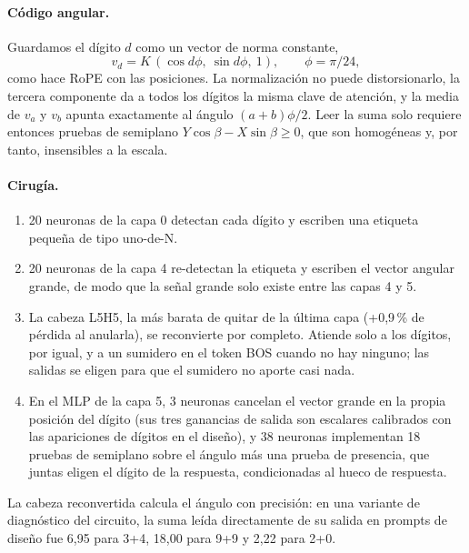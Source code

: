\documentclass[11pt]{article}
\begin{document}
\paragraph{Código angular.} Guardamos el dígito $d$ como un vector de norma constante,
\begin{equation}
v_d = K\,(\cos d\phi,\ \sin d\phi,\ 1), \qquad \phi=\pi/24,
\end{equation}
como hace RoPE con las posiciones. La normalización no puede distorsionarlo, la tercera componente da a todos los dígitos la misma clave de atención, y la media de $v_a$ y $v_b$ apunta exactamente al ángulo $(a+b)\phi/2$. Leer la suma solo requiere entonces pruebas de semiplano $Y\cos\beta - X\sin\beta \ge 0$, que son homogéneas y, por tanto, insensibles a la escala.

\paragraph{Cirugía.}
\begin{enumerate}[leftmargin=*]
\item 20 neuronas de la capa 0 detectan cada dígito y escriben una etiqueta pequeña de tipo uno-de-N.
\item 20 neuronas de la capa 4 re-detectan la etiqueta y escriben el vector angular grande, de modo que la señal grande solo existe entre las capas 4 y 5.
\item La cabeza L5H5, la más barata de quitar de la última capa (+0,9\,\% de pérdida al anularla), se reconvierte por completo. Atiende solo a los dígitos, por igual, y a un sumidero en el token BOS cuando no hay ninguno; las salidas se eligen para que el sumidero no aporte casi nada.
\item En el MLP de la capa 5, 3 neuronas cancelan el vector grande en la propia posición del dígito (sus tres ganancias de salida son escalares calibrados con las apariciones de dígitos en el diseño), y 38 neuronas implementan 18 pruebas de semiplano sobre el ángulo más una prueba de presencia, que juntas eligen el dígito de la respuesta, condicionadas al hueco de respuesta.
\end{enumerate}

La cabeza reconvertida calcula el ángulo con precisión: en una variante de diagnóstico del circuito, la suma leída directamente de su salida en prompts de diseño fue 6,95 para 3+4, 18,00 para 9+9 y 2,22 para 2+0.
\end{document}
